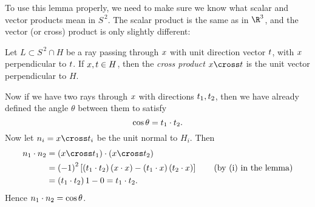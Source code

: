 	
	

To use this lemma properly, we need to make sure we know what scalar and vector products mean in $S^{\,2}$. The scalar product is the same as in $\R^3$, and the vector (or cross) product is only slightly different:

\begin{definition}
	Let $L\subset S^{\,2} \cap H$ be a ray passing through $\xx$ with unit direction vector $\tt$, with $\xx$ perpendicular to $\tt$. If $\xx,\tt\in H$, then the \emph{cross product} $\xx \cross \tt$ is the unit vector perpendicular to $H$.
\end{definition}

Now if we have two rays through $\xx$ with directions $\tt_1, \tt_2$, then we have already defined the angle $\theta$ between them to satisfy
\begin{equation*}
	\cos \theta = \tt_1 \cdot \tt_2.
\end{equation*}
Now let $\nn_i = \xx \cross \tt_i$ be the unit normal to $H_i$. Then
\begin{align*}
	\nn_1 \cdot \nn_2
	&= \left( \xx\cross\tt_1 \right) \cdot \left( \xx\cross\tt_2 \right) \\
	&= \left( -1 \right)^2 \left[ \left( \tt_1\cdot\tt_2 \right)\left( \xx\cdot\xx \right) - \left( \tt_1 \cdot \xx \right) \left( \tt_2\cdot\xx \right) \right] \tag{by (i) in the lemma} \\ %
	&= \left( \tt_1 \cdot \tt_2 \right)1 - 0 = \tt_1 \cdot \tt_2.
\end{align*}
Hence $\nn_1 \cdot \nn_2 = \cos\theta$.

